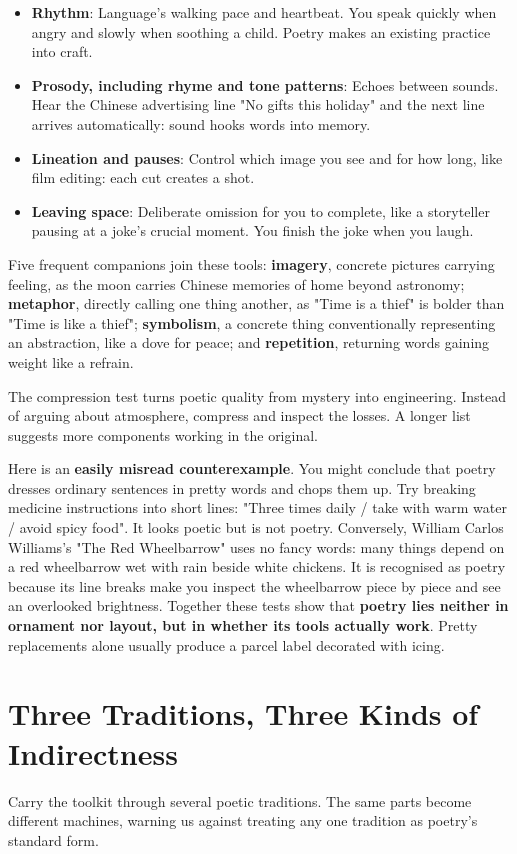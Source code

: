 \begin{itemize}
\item \textbf{Rhythm}: Language's walking pace and heartbeat. You speak quickly when angry and slowly when soothing a child. Poetry makes an existing practice into craft.
\item \textbf{Prosody, including rhyme and tone patterns}: Echoes between sounds. Hear the Chinese advertising line "No gifts this holiday" and the next line arrives automatically: sound hooks words into memory.
\item \textbf{Lineation and pauses}: Control which image you see and for how long, like film editing: each cut creates a shot.
\item \textbf{Leaving space}: Deliberate omission for you to complete, like a storyteller pausing at a joke's crucial moment. You finish the joke when you laugh.
\end{itemize}
Five frequent companions join these tools: \textbf{imagery}, concrete pictures carrying feeling, as the moon carries Chinese memories of home beyond astronomy; \textbf{metaphor}, directly calling one thing another, as "Time is a thief" is bolder than "Time is like a thief"; \textbf{symbolism}, a concrete thing conventionally representing an abstraction, like a dove for peace; and \textbf{repetition}, returning words gaining weight like a refrain.

The compression test turns poetic quality from mystery into engineering. Instead of arguing about atmosphere, compress and inspect the losses. A longer list suggests more components working in the original.

Here is an \textbf{easily misread counterexample}. You might conclude that poetry dresses ordinary sentences in pretty words and chops them up. Try breaking medicine instructions into short lines: "Three times daily / take with warm water / avoid spicy food". It looks poetic but is not poetry. Conversely, William Carlos Williams's "The Red Wheelbarrow" uses no fancy words: many things depend on a red wheelbarrow wet with rain beside white chickens. It is recognised as poetry because its line breaks make you inspect the wheelbarrow piece by piece and see an overlooked brightness. Together these tests show that \textbf{poetry lies neither in ornament nor layout, but in whether its tools actually work}. Pretty replacements alone usually produce a parcel label decorated with icing.

\section[Three Traditions, Three Detours]{Three Traditions, Three Kinds of Indirectness}
Carry the toolkit through several poetic traditions. The same parts become different machines, warning us against treating any one tradition as poetry's standard form.

